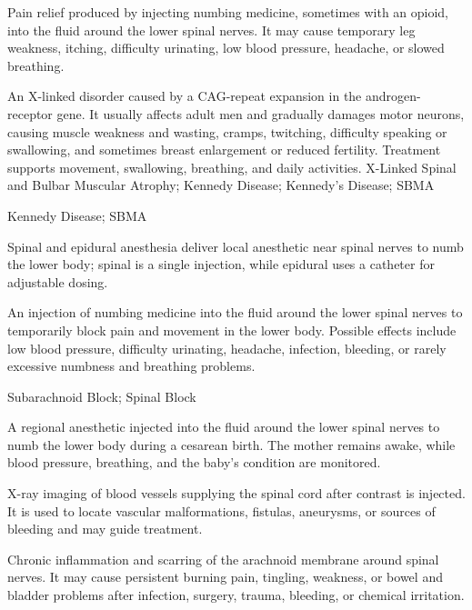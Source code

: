  Pain relief produced by injecting numbing medicine, sometimes with an opioid, into the fluid around the lower spinal nerves. It may cause temporary leg weakness, itching, difficulty urinating, low blood pressure, headache, or slowed breathing.

 An X-linked disorder caused by a CAG-repeat expansion in the androgen-receptor gene. It usually affects adult men and gradually damages motor neurons, causing muscle weakness and wasting, cramps, twitching, difficulty speaking or swallowing, and sometimes breast enlargement or reduced fertility. Treatment supports movement, swallowing, breathing, and daily activities.
\synonyms
X-Linked Spinal and Bulbar Muscular Atrophy; Kennedy Disease; Kennedy's Disease; SBMA

\synonyms
Kennedy Disease; SBMA

 Spinal and epidural anesthesia deliver local anesthetic near spinal nerves to numb the lower body; spinal is a single injection, while epidural uses a catheter for adjustable dosing.

 An injection of numbing medicine into the fluid around the lower spinal nerves to temporarily block pain and movement in the lower body. Possible effects include low blood pressure, difficulty urinating, headache, infection, bleeding, or rarely excessive numbness and breathing problems.

\synonyms
Subarachnoid Block; Spinal Block

 A regional anesthetic injected into the fluid around the lower spinal nerves to numb the lower body during a cesarean birth. The mother remains awake, while blood pressure, breathing, and the baby's condition are monitored.

 X-ray imaging of blood vessels supplying the spinal cord after contrast is injected. It is used to locate vascular malformations, fistulas, aneurysms, or sources of bleeding and may guide treatment.

 Chronic inflammation and scarring of the arachnoid membrane around spinal nerves. It may cause persistent burning pain, tingling, weakness, or bowel and bladder problems after infection, surgery, trauma, bleeding, or chemical irritation.

